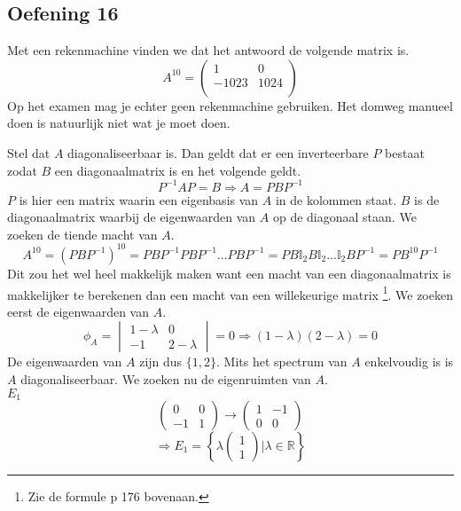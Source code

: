 \documentclass[lineaire_algebra_oplossingen.tex]{subfiles}
\begin{document}
\subsection{Oefening 16}
Met een rekenmachine vinden we dat het antwoord de volgende matrix is.
\[
A^{10}=
\begin{pmatrix}
1 & 0\\
-1023 & 1024\\
\end{pmatrix}
\]
Op het examen mag je echter geen rekenmachine gebruiken.
Het domweg manueel doen is natuurlijk niet wat je moet doen.

Stel dat $A$ diagonaliseerbaar is. Dan geldt dat er een inverteerbare $P$ bestaat zodat $B$ een diagonaalmatrix is en het volgende geldt.
\[
P^{-1}AP = B \Rightarrow A = PBP^{-1}
\]
$P$ is hier een matrix waarin een eigenbasis van $A$ in de kolommen staat. $B$ is de diagonaalmatrix waarbij de eigenwaarden van $A$ op de diagonaal staan.
We zoeken de tiende macht van $A$.
\[
A^{10} = (PBP^{-1})^{10} = PBP^{-1}PBP^{-1}...PBP^{-1} = PB\mathbb{I}_2B\mathbb{I}_2...\mathbb{I}_2BP^{-1} = PB^{10}P^{-1}
\]
Dit zou het wel heel makkelijk maken want een macht van een diagonaalmatrix is makkelijker te berekenen dan een macht van een willekeurige matrix \footnote{Zie de formule p 176 bovenaan.}.
We zoeken eerst de eigenwaarden van $A$.
\[
\phi_A =
\begin{vmatrix}
1-\lambda & 0\\
-1 & 2-\lambda
\end{vmatrix}
= 0
\Rightarrow (1-\lambda)(2-\lambda)=0
\]
De eigenwaarden van $A$ zijn dus $\{1,2\}$. Mits het spectrum van $A$ enkelvoudig is is $A$ diagonaliseerbaar.
We zoeken nu de eigenruimten van $A$.\\

\emph{$E_1$}\\
\[
\begin{pmatrix}
0 & 0\\
-1 & 1
\end{pmatrix}
\rightarrow
\begin{pmatrix}
1 & -1\\
0 & 0
\end{pmatrix}
\]
\[
\Rightarrow 
E_1 = 
\left\{
\lambda
\begin{pmatrix}
1\\1
\end{pmatrix}
| \lambda \in \mathbb{R}
\right\}
\]
\end{document}
